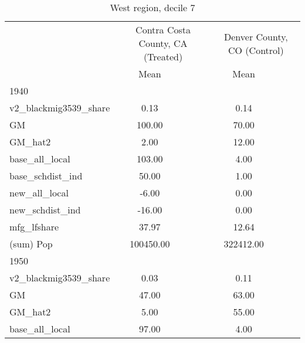 \begin{table}[htbp]\centering
\def\sym#1{\ifmmode^{#1}\else\(^{#1}\)\fi}
\caption{West region, decile 7 \label{tab1}}
\begin{tabular}{l*{2}{ccc}}
\toprule
                    &\multicolumn{3}{c}{Contra Costa County, CA (Treated)}&\multicolumn{3}{c}{Denver County, CO (Control)}\\
                    &        Mean&            &            &        Mean&            &            \\
\midrule
1940                &            &            &            &            &            &            \\
v2\_blackmig3539\_share&        0.13&            &            &        0.14&            &            \\
GM                  &      100.00&            &            &       70.00&            &            \\
GM\_hat2             &        2.00&            &            &       12.00&            &            \\
base\_all\_local      &      103.00&            &            &        4.00&            &            \\
base\_schdist\_ind    &       50.00&            &            &        1.00&            &            \\
new\_all\_local       &       -6.00&            &            &        0.00&            &            \\
new\_schdist\_ind     &      -16.00&            &            &        0.00&            &            \\
mfg\_lfshare         &       37.97&            &            &       12.64&            &            \\
(sum) Pop           &   100450.00&            &            &   322412.00&            &            \\
\midrule
1950                &            &            &            &            &            &            \\
v2\_blackmig3539\_share&        0.03&            &            &        0.11&            &            \\
GM                  &       47.00&            &            &       63.00&            &            \\
GM\_hat2             &        5.00&            &            &       55.00&            &            \\
base\_all\_local      &       97.00&            &            &        4.00&            &            \\

\end{tabular}
\end{table}
